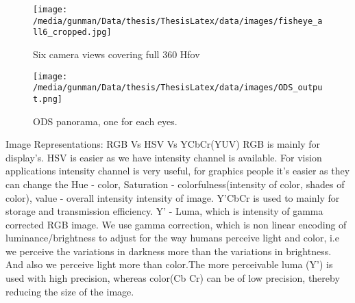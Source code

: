 \begin{figure}[h]
	\begin{center}
		\texttt{[image: /media/gunman/Data/thesis/ThesisLatex/data/images/fisheye\_all6\_cropped.jpg]}
		\caption{Six camera views covering full 360 Hfov}
		\label{ODS_input}
	\end{center}
	\vspace{-0.3in}
\end{figure} 
\begin{figure}[h]
	\begin{center}
		\texttt{[image: /media/gunman/Data/thesis/ThesisLatex/data/images/ODS\_output.png]}
		\caption{ODS panorama, one for each eyes.}
		\label{ODS_output}
	\end{center}
	\vspace{-0.3in}
\end{figure} 


%

%

Image Representations:
RGB Vs HSV Vs YCbCr(YUV)
RGB is mainly for display's. HSV is easier as we have intensity channel is available. For vision applications intensity channel is very useful, for graphics people it's easier as they can change the Hue - color, Saturation - colorfulness(intensity of color, shades of color), value - overall intensity  intensity of image. Y'CbCr is used to mainly for storage and transmission efficiency. Y' - Luma, which is intensity of gamma corrected RGB image. We use gamma correction, which is non linear encoding of luminance/brightness to adjust for the way humans perceive light and color, i.e we perceive the variations in darkness more than the variations in brightness. And also we perceive light more than color.The more perceivable luma (Y') is used with high precision, whereas color(Cb Cr) can be of low precision, thereby reducing the size of the image.

